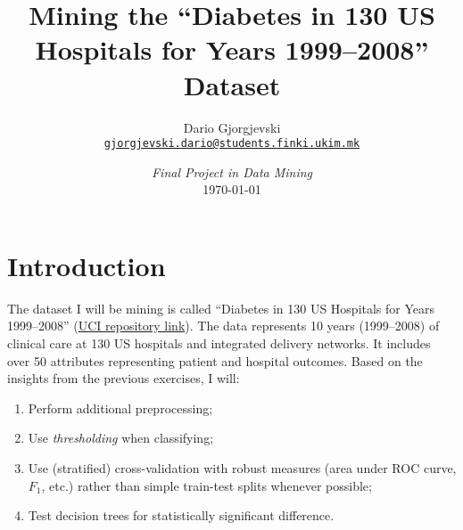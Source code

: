 \documentclass{article}\usepackage[]{graphicx}\usepackage[]{color}
\title{Mining the ``Diabetes in \num{130} US Hospitals for Years 1999--2008'' Dataset}
\author{Dario Gjorgjevski\\
  \href{mailto:gjorgjevski.dario@students.finki.ukim.mk}
  {\texttt{gjorgjevski.dario@students.finki.ukim.mk}}}
\date{\textit{Final Project in Data Mining} \\[.5\baselineskip] \today}
\begin{document}
\maketitle

\section{Introduction}

The dataset I will be mining is called ``Diabetes in \num{130} US Hospitals for
Years 1999--2008''
(\href{https://archive.ics.uci.edu/ml/datasets/Diabetes+130-US+hospitals+for+years+1999-2008}{UCI
  repository link}).  The data represents \num{10} years (1999--2008) of
clinical care at \num{130} US hospitals and integrated delivery networks.  It
includes over \num{50} attributes representing patient and hospital outcomes.
Based on the insights from the previous exercises, I will:
\begin{enumerate}
\item Perform additional preprocessing;
\item Use \emph{thresholding} when classifying;
\item Use (stratified) cross-validation with robust measures (area under ROC
  curve, $F_1$, etc.) rather than simple train-test splits whenever possible;
\item Test decision trees for statistically significant difference.
\end{enumerate}
\end{document}
